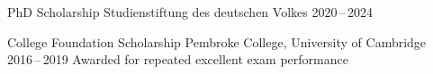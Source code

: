 %
\begin{cvhonors}%
  \cvhonor%
    {PhD Scholarship} %
    {Studienstiftung des deutschen Volkes} %
    {} %
    {2020\,--\,2024} %
    {} %
\end{cvhonors}%
\begin{cvhonors}%
  \cvhonor%
    {College Foundation Scholarship} %
    {Pembroke College, University of Cambridge} %
    {} %
    {2016\,--\,2019} %
    {Awarded for repeated excellent exam performance} %
\end{cvhonors}
